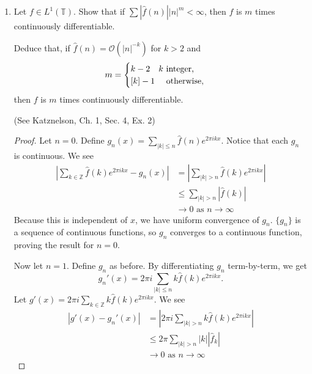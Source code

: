 \documentclass[a4paper]{article}
\newcommand{\Z}{\mathbb{Z}}
\begin{document}
\begin{enumerate}
\begin{proof}
  We know $c_0 = \hat{f}(0)$, so the claim is true for trigonometric polynomials.

  Now take an arbitrary $f \in L^1$. We can approximate $f$ by a trigonometric polynomial in the $L^1$ norm. So for any $\varepsilon > 0$, we can find
  a trigonometric polynomial $P(t)$ such that $\|f-P\|_{L^1} < \varepsilon$. Then
  \begin{align*}
    \left| \int_{0}^{1} \left( f(t) - P(t) \right) g(nt) dt \right| &\leq \|g\|_{L^\infty} \|f - P\|_{L^1} \\
    &< \|g\|_{L^\infty} \varepsilon
  \end{align*}

  Letting $\varepsilon \to 0$, we get the result for all $f \in L^{1}$.

\end{proof}

\item  Let $f \in L^1 (\mathbb T)$. Show that if $\sum | \widehat{f} (n) | |n|^{m} < \infty$, then $f$ is $m$ times continuously differentiable.

Deduce that, if $\widehat{f} (n ) = \mathcal O (|n|^{-k})$ for $k>2$ and $$ m = \begin{cases} k-2 \quad k \textup{ integer, } \\ [k]-1 \quad \textup{ otherwise, } \end{cases}$$ then $f$ is $m$ times continuously differentiable.

(See Katznelson, Ch. 1, Sec. 4, Ex. 2)

\begin{proof}

  Let $n = 0$. Define $g_n(x) = \sum_{|k|\leq n} \hat{f}(n) e^{2\pi i k x}$. Notice that each $g_n$ is continuous. We see
  \begin{align*}
    \left| \sum_{k \in \Z} \hat{f}(k) e^{2\pi i k x} - g_n(x) \right| &= \left| \sum_{|k|>n} \hat{f}(k) e^{2 \pi i k x} \right| \\
    &\leq \sum_{|k|>n} |\hat{f}(k)| \\
    &\to 0 \text{ as } n \to \infty
  \end{align*}
  Because this is independent of $x$, we have uniform convergence of $g_n$. $\{ g_n \}$ is a sequence of continuous functions, so $g_n$ converges to a
  continuous function, proving the result for $n=0$.

  Now let $n = 1$. Define $g_n$ as before. By differentiating $g_n$ term-by-term, we get
  \[ g_n'(x) = 2 \pi i \sum_{|k|\leq n} k \hat{f}(k) e^{2 \pi i k x} .\]
  Let $g'(x) = 2 \pi i \sum_{k \in \Z} k \hat{f}(k) e^{2 \pi i k x}$. We see
  \begin{align*}
    \left| g'(x) - g_n'(x) \right| &= \left| 2 \pi i \sum_{|k|>n} k \hat{f}(k) e^{2 \pi i k x} \right| \\
    &\leq 2 \pi \sum_{|k|>n} |k| |\hat{f}_k| \\
    &\to 0 \text{ as } n \to \infty
  \end{align*}


\end{proof}
\end{enumerate}
\end{document}
